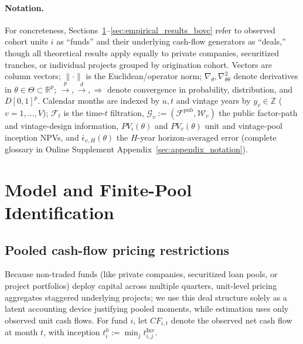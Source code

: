 \documentclass[12pt]{article}
\begin{document}
\paragraph{Notation.}
For concreteness, Sections~\ref{sec:model_id}--\ref{sec:empirical_results_bovc} refer to observed cohort units $i$ as ``funds'' and their underlying cash-flow generators as ``deals,'' though all theoretical results apply equally to private companies, securitized tranches, or individual projects grouped by origination cohort.
Vectors are column vectors; $\|\cdot\|$ is the Euclidean/operator norm; $\nabla_\theta, \nabla_{\theta\theta}^2$ denote derivatives in $\theta \in \Theta \subset \mathbb{R}^p$; $\xrightarrow{p}, \xrightarrow{d}, \Rightarrow$ denote convergence in probability, distribution, and $D[0,1]^p$.
Calendar months are indexed by $u, t$ and vintage years by $y_v \in \mathbb{Z}$ ($v = 1,\dots,V$); $\mathcal{F}_t$ is the time-$t$ filtration, $\mathcal{G}_v := (\mathcal{F}^{\mathrm{pub}}, \mathcal{W}_v)$ the public factor-path and vintage-design information, $PV_i(\theta)$ and $PV_v(\theta)$ unit and vintage-pool inception NPVs, and $\bar\epsilon_{v,H}(\theta)$ the $H$-year horizon-averaged error (complete glossary in Online Supplement Appendix~\ref{sec:appendix_notation}).


\section{Model and Finite-Pool Identification}
\label{sec:model_id}

\subsection{Pooled cash-flow pricing restrictions}
\label{sec:asset_pricing_pooled}

Because non-traded funds (like private companies, securitized loan pools, or project portfolios) deploy capital across multiple quarters, unit-level pricing aggregates staggered underlying projects; we use this deal structure solely as a latent accounting device justifying pooled moments, while estimation uses only observed unit cash flows.
For fund $i$, let $CF_{i,t}$ denote the observed net cash flow at month $t$, with inception $t_i^0 := \min_j t_{i,j}^{\mathrm{Inv}}$.
\end{document}
